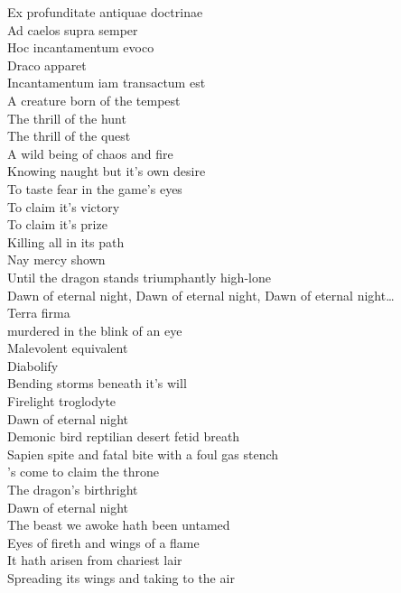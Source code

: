 Ex profunditate antiquae doctrinae \\
Ad caelos supra semper \\
Hoc incantamentum evoco \\
Draco apparet \\
Incantamentum iam transactum est \\

A creature born of the tempest \\
The thrill of the hunt \\
The thrill of the quest \\
A wild being of chaos and fire \\
Knowing naught but it's own desire \\
To taste fear in the game's eyes \\
To claim it's victory \\
To claim it's prize \\
Killing all in its path \\
Nay mercy shown \\
Until the dragon stands triumphantly high-lone \\

Dawn of eternal night, Dawn of eternal night, Dawn of eternal night… \\

Terra firma \\
 murdered in the blink of an eye \\
Malevolent equivalent \\
Diabolify \\
Bending storms beneath it's will \\
Firelight troglodyte \\
Dawn of eternal night \\

Demonic bird reptilian desert fetid breath \\
Sapien spite and fatal bite with a foul gas stench \\
's come to claim the throne \\
The dragon's birthright \\
Dawn of eternal night \\

The beast we awoke hath been untamed \\
Eyes of fireth and wings of a flame \\
It hath arisen from chariest lair \\
Spreading its wings and taking to the air \\

